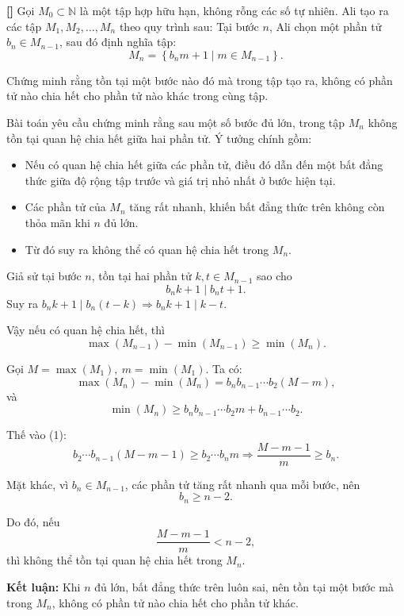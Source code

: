 \documentclass[../01-divisibility.tex]{subfiles}
\begin{document}
\begin{example*}\label{example:IRN-2015-N2}\textbf{[]}
	Gọi \( M_0 \subset \mathbb{N} \) là một tập hợp hữu hạn, không rỗng các số tự nhiên. Ali tạo ra các tập \( M_1, M_2, \dots, M_n \) theo quy trình sau:
	Tại bước \( n \), Ali chọn một phần tử \( b_n \in M_{n-1} \), sau đó định nghĩa tập:
	\[
		M_n = \left\{ b_n m + 1 \mid m \in M_{n-1} \right\}.
	\]

	Chứng minh rằng tồn tại một bước nào đó mà trong tập tạo ra, không có phần tử nào chia hết cho phần tử nào khác trong cùng tập.
\end{example*}

\begin{story*}
	Bài toán yêu cầu chứng minh rằng sau một số bước đủ lớn, trong tập \( M_n \) không tồn tại quan hệ chia hết giữa hai phần tử.  
	Ý tưởng chính gồm:
	\begin{itemize}[topsep=0pt, itemsep=0pt]
		\item Nếu có quan hệ chia hết giữa các phần tử, điều đó dẫn đến một bất đẳng thức giữa độ rộng tập trước và giá trị nhỏ nhất ở bước hiện tại.
		\item Các phần tử của \( M_n \) tăng rất nhanh, khiến bất đẳng thức trên không còn thỏa mãn khi \( n \) đủ lớn.
		\item Từ đó suy ra không thể có quan hệ chia hết trong \( M_n \).
	\end{itemize}
\end{story*}

\begin{soln}\footnotemark
	Giả sử tại bước \( n \), tồn tại hai phần tử \( k, t \in M_{n-1} \) sao cho
	\[
		b_n k + 1 \mid b_n t + 1.
	\]
	Suy ra \( b_n k + 1 \mid b_n(t - k) \Rightarrow b_n k + 1 \mid k - t \).

	Vậy nếu có quan hệ chia hết, thì
	\[
		\max(M_{n-1}) - \min(M_{n-1}) \geq \min(M_n). \tag{1}
	\]

	Gọi \( M = \max(M_1),\ m = \min(M_1) \). Ta có:
	\[
		\max(M_n) - \min(M_n) = b_n b_{n-1} \cdots b_2 (M - m),
	\]
	và
	\[
		\min(M_n) \geq b_n b_{n-1} \cdots b_2 m + b_{n-1} \cdots b_2.
	\]

	Thế vào (1):
	\[
		b_2 \cdots b_{n-1} (M - m - 1) \geq b_2 \cdots b_n m \Rightarrow \frac{M - m - 1}{m} \geq b_n.
	\]

	Mặt khác, vì \( b_n \in M_{n-1} \), các phần tử tăng rất nhanh qua mỗi bước, nên
	\[
		b_n \geq n - 2.
	\]

	Do đó, nếu
	\[
		\frac{M - m - 1}{m} < n - 2,
	\]
	thì không thể tồn tại quan hệ chia hết trong \( M_n \).

	\textbf{Kết luận:} Khi \( n \) đủ lớn, bất đẳng thức trên luôn sai, nên tồn tại một bước mà trong \( M_n \), không có phần tử nào chia hết cho phần tử khác.
\end{soln}

\end{document}
